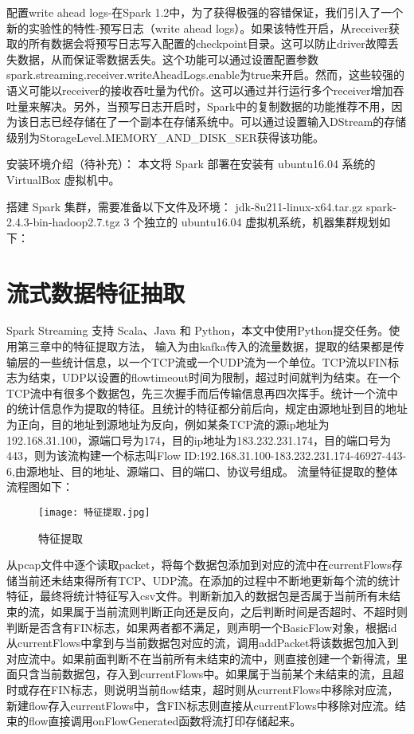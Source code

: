   配置write ahead logs-在Spark 1.2中，为了获得极强的容错保证，我们引入了一个新的实验性的特性-预写日志（write ahead logs）。如果该特性开启，从receiver获取的所有数据会将预写日志写入配置的checkpoint目录。这可以防止driver故障丢失数据，从而保证零数据丢失。这个功能可以通过设置配置参数spark.streaming.receiver.writeAheadLogs.enable为true来开启。然而，这些较强的语义可能以receiver的接收吞吐量为代价。这可以通过并行运行多个receiver增加吞吐量来解决。另外，当预写日志开启时，Spark中的复制数据的功能推荐不用，因为该日志已经存储在了一个副本在存储系统中。可以通过设置输入DStream的存储级别为StorageLevel.MEMORY\_AND\_DISK\_SER获得该功能。

安装环境介绍（待补充）：
本文将 Spark 部署在安装有 ubuntu16.04 系统的 VirtualBox 虚拟机中。

搭建 Spark 集群，需要准备以下文件及环境：
jdk-8u211-linux-x64.tar.gz
spark-2.4.3-bin-hadoop2.7.tgz
3 个独立的 ubuntu16.04 虚拟机系统，机器集群规划如下：

\section{流式数据特征抽取}
Spark Streaming 支持 Scala、Java 和 Python，本文中使用Python提交任务。使用第三章中的特征提取方法，
输入为由kafka传入的流量数据，提取的结果都是传输层的一些统计信息，以一个TCP流或一个UDP流为一个单位。TCP流以FIN标志为结束，UDP以设置的flowtimeout时间为限制，超过时间就判为结束。在一个TCP流中有很多个数据包，先三次握手而后传输信息再四次挥手。统计一个流中的统计信息作为提取的特征。且统计的特征都分前后向，规定由源地址到目的地址为正向，目的地址到源地址为反向，例如某条TCP流的源ip地址为192.168.31.100，源端口号为174，目的ip地址为183.232.231.174，目的端口号为443，则为该流构建一个标志叫Flow ID:192.168.31.100-183.232.231.174-46927-443-6,由源地址、目的地址、源端口、目的端口、协议号组成。
流量特征提取的整体流程图如下：

\begin{figure}
    \centering
    \texttt{[image: 特征提取.jpg]}
    \caption{特征提取}
    \label{fig:特征提取}
  \end{figure}

从pcap文件中逐个读取packet，将每个数据包添加到对应的流中在currentFlows存储当前还未结束得所有TCP、UDP流。在添加的过程中不断地更新每个流的统计特征，最终将统计特征写入csv文件。判断新加入的数据包是否属于当前所有未结束的流，如果属于当前流则判断正向还是反向，之后判断时间是否超时、不超时则判断是否含有FIN标志，如果两者都不满足，则声明一个BasicFlow对象，根据id从currentFlows中拿到与当前数据包对应的流，调用addPacket将该数据包加入到对应流中。如果前面判断不在当前所有未结束的流中，则直接创建一个新得流，里面只含当前数据包，存入到currentFlows中。如果属于当前某个未结束的流，且超时或存在FIN标志，则说明当前flow结束，超时则从currentFlows中移除对应流，新建flow存入currentFlows中，含FIN标志则直接从currentFlows中移除对应流。结束的flow直接调用onFlowGenerated函数将流打印存储起来。

